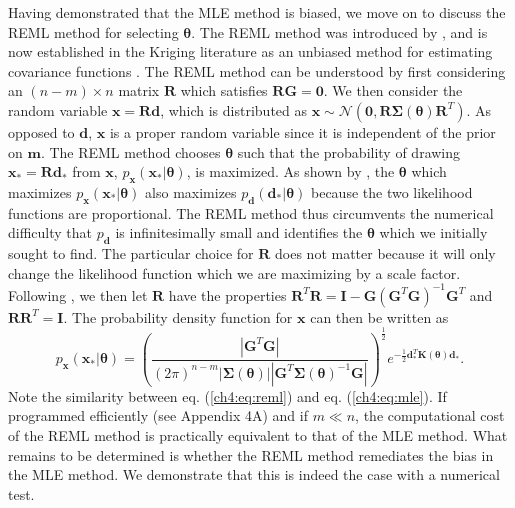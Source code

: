 Having demonstrated that the MLE method is biased, we move on to discuss the REML method for selecting $\mathbf{\theta}$.  The REML method was introduced by \citet{Patterson1971}, and is now established in the Kriging literature as an unbiased method for estimating covariance functions \citep[e.g.,][]{Cressie1992}. The REML method can be understood by first considering an $(n-m)\times n$ matrix $\mathbf{R}$ which satisfies $\mathbf{R}\mathbf{G}=\mathbf{0}$.  We then consider the random variable $\mathbf{x}=\mathbf{R}\mathbf{d}$, which is distributed as $\mathbf{x} \sim \mathcal{N}(\mathbf{0},\mathbf{R}\mathbf{\Sigma}(\mathbf{\theta})\mathbf{R}^T)$.  As opposed to $\mathbf{d}$, $\mathbf{x}$ is a proper random variable since it is independent of the prior on $\mathbf{m}$. The REML method chooses $\mathbf{\theta}$ such that the probability of drawing $\mathbf{x}_*=\mathbf{R}\mathbf{d}_*$ from $\mathbf{x}$, $p_\mathbf{x}(\mathbf{x}_*|\mathbf{\theta})$, is maximized. As shown by \citet{Harville1974}, the $\mathbf{\theta}$ which maximizes $p_\mathbf{x}(\mathbf{x}_*|\mathbf{\theta})$ also maximizes $p_\mathbf{d}(\mathbf{d}_*|\mathbf{\theta})$ because the two likelihood functions are proportional. The REML method thus circumvents the numerical difficulty that $p_\mathbf{d}$ is infinitesimally small and identifies the $\mathbf{\theta}$ which we initially sought to find. The particular choice for $\mathbf{R}$ does not matter because it will only change the likelihood function which we are maximizing by a scale factor. Following \citet{Harville1974}, we then let $\mathbf{R}$ have the properties $\mathbf{R}^T\mathbf{R} = \mathbf{I} - \mathbf{G}(\mathbf{G}^T\mathbf{G})^{-1}\mathbf{G}^T$ and $\mathbf{R}\mathbf{R}^T = \mathbf{I}$. The probability density function for $\mathbf{x}$ can then be written as 
\begin{equation}\label{ch4:eq:reml}
p_\mathbf{x}(\mathbf{x}_*|\mathbf{\theta}) =
\left(\frac{\left|\mathbf{G}^T\mathbf{G}\right|}
           {(2\pi)^{n-m}
            \left| \mathbf{\Sigma}(\mathbf{\theta}) \right| 
            \left| \mathbf{G}^T\mathbf{\Sigma}(\mathbf{\theta})^{-1}\mathbf{G} \right|}\right)^{\frac{1}{2}} 
e^{-\tfrac{1}{2}\mathbf{d}_*^T\mathbf{K}(\mathbf{\theta})\mathbf{d}_*}.
\end{equation}
Note the similarity between eq. (\ref{ch4:eq:reml}) and eq. (\ref{ch4:eq:mle}). If programmed efficiently (see Appendix 4A) and if $m \ll n$, the computational cost of the REML method is practically equivalent to that of the MLE method. What remains to be determined is whether the REML method remediates the bias in the MLE method. We demonstrate that this is indeed the case with a numerical test. 

